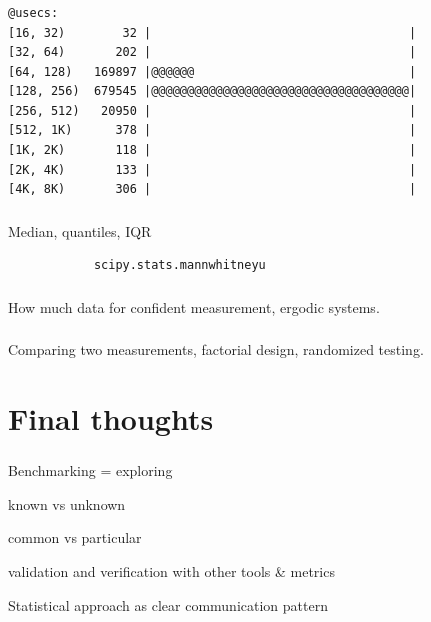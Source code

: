 \documentclass[usenames,dvipsnames, 18pt, compress, aspectratio=169]{beamer}
\begin{document}
\begin{frame}[fragile]{}
    \frametitle{}
    \begin{center}
        \begin{verbatim}
@usecs:
[16, 32)        32 |                                    |
[32, 64)       202 |                                    |
[64, 128)   169897 |@@@@@@                              |
[128, 256)  679545 |@@@@@@@@@@@@@@@@@@@@@@@@@@@@@@@@@@@@|
[256, 512)   20950 |                                    |
[512, 1K)      378 |                                    |
[1K, 2K)       118 |                                    |
[2K, 4K)       133 |                                    |
[4K, 8K)       306 |                                    |
        \end{verbatim}

    \end{center}
\end{frame}

\begin{frame}[fragile]{}
    \frametitle{}
    \begin{center}

    Median, quantiles, IQR

    \begin{verbatim}
            scipy.stats.mannwhitneyu
    \end{verbatim}
    \end{center}
\end{frame}

\begin{frame}
    \frametitle{}
    \begin{center}
        How much data for confident measurement, ergodic systems.
    \end{center}
\end{frame}

\begin{frame}
    \frametitle{}
    \begin{center}
        Comparing two measurements, factorial design, randomized testing.
    \end{center}
\end{frame}

\section{Final thoughts}

\begin{frame}
    \frametitle{}
    \begin{center}
        Benchmarking = exploring

        known vs unknown

        common vs particular

        validation and verification with other tools \& metrics

        Statistical approach as clear communication pattern
    \end{center}
\end{frame}
\end{document}
